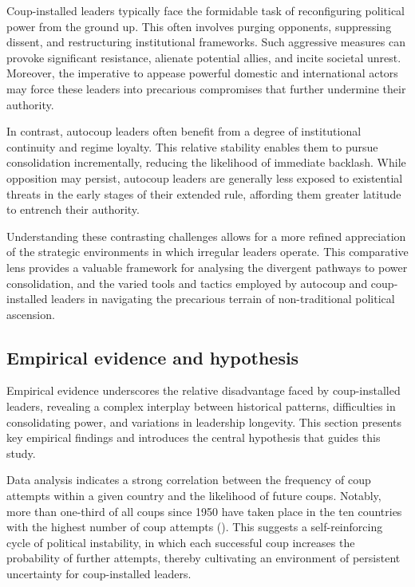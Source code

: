 \documentclass[
  12pt,
]{report}
\begin{document}
Coup-installed leaders typically face the formidable task of
reconfiguring political power from the ground up. This often involves
purging opponents, suppressing dissent, and restructuring institutional
frameworks. Such aggressive measures can provoke significant resistance,
alienate potential allies, and incite societal unrest. Moreover, the
imperative to appease powerful domestic and international actors may
force these leaders into precarious compromises that further undermine
their authority.

In contrast, autocoup leaders often benefit from a degree of
institutional continuity and regime loyalty. This relative stability
enables them to pursue consolidation incrementally, reducing the
likelihood of immediate backlash. While opposition may persist, autocoup
leaders are generally less exposed to existential threats in the early
stages of their extended rule, affording them greater latitude to
entrench their authority.

Understanding these contrasting challenges allows for a more refined
appreciation of the strategic environments in which irregular leaders
operate. This comparative lens provides a valuable framework for
analysing the divergent pathways to power consolidation, and the varied
tools and tactics employed by autocoup and coup-installed leaders in
navigating the precarious terrain of non-traditional political
ascension.

\subsection*{Empirical evidence and
hypothesis}\label{empirical-evidence-and-hypothesis}

Empirical evidence underscores the relative disadvantage faced by
coup-installed leaders, revealing a complex interplay between historical
patterns, difficulties in consolidating power, and variations in
leadership longevity. This section presents key empirical findings and
introduces the central hypothesis that guides this study.

Data analysis indicates a strong correlation between the frequency of
coup attempts within a given country and the likelihood of future coups.
Notably, more than one-third of all coups since 1950 have taken place in
the ten countries with the highest number of coup attempts
(). This suggests a
self-reinforcing cycle of political instability, in which each
successful coup increases the probability of further attempts, thereby
cultivating an environment of persistent uncertainty for coup-installed
leaders.
\end{document}

